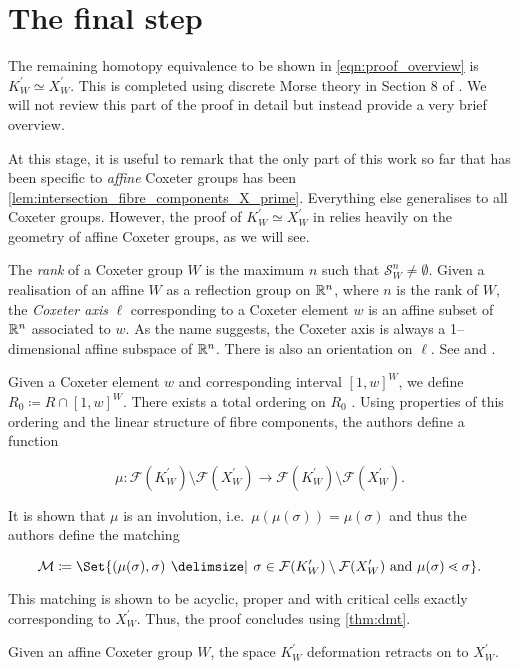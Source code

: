 \documentclass[class=article, crop=false]{standalone}
\begin{document}
\section{The final step}
The remaining homotopy equivalence to be shown in \eqref{eqn:proof_overview} is $K^\prime_W \simeq X^\prime_W$. This is completed using discrete Morse theory in Section 8 of \cite{paolini_salvetti_kpi1_2021}. We will not review this part of the proof in detail but instead provide a very brief overview.

At this stage, it is useful to remark that the only part of this work so far that has been specific to \emph{affine} Coxeter groups has been \cref{lem:intersection_fibre_components_X_prime}. Everything else generalises to all Coxeter groups. However, the proof of $K_W^\prime \simeq X^\prime_W$ in \cite{paolini_salvetti_kpi1_2021} relies heavily on the geometry of affine Coxeter groups, as we will see.

The \emph{rank} of a Coxeter group $W$ is the maximum $n$ such that $\mathcal{S}^n_W \neq \emptyset$. Given a realisation of an affine $W$ as a reflection group on $\mathbb{R}^n$, where $n$ is the rank of $W$, the \emph{Coxeter axis} $\ell$ corresponding to a Coxeter element $w$ is an affine subset of $\mathbb{R}^n$ associated to $w$. As the name suggests, the Coxeter axis is always a 1--dimensional affine subspace of $\mathbb{R}^n$. There is also an orientation on $\ell$. See \cite[Section 4]{paolini_salvetti_kpi1_2021} and \cite[Section 7]{mccammond_dual_2015}.

Given a Coxeter element $w$ and corresponding interval $[1,w]^W$, we define $R_0 \coloneq R \cap [1,w]^W$. There exists a total ordering on $R_0$ \cite[Definition 4.10]{paolini_salvetti_kpi1_2021}. Using properties of this ordering and the linear structure of fibre components, the authors define a function 

\begin{equation*}
    \mu \colon \mathcal{F}(K_W^\prime)\setminus\mathcal{F}(X_W^\prime) \to \mathcal{F}(K_W^\prime)\setminus\mathcal{F}(X_W^\prime) .
\end{equation*}

It is shown that $\mu$ is an involution, i.e.~$\mu(\mu(\sigma)) = \mu(\sigma)$ and thus the authors define the matching

\begin{equation*}
    \mathcal{M} \coloneq \Set{(\mu(\sigma), \sigma) \given \sigma \in \mathcal{F}(K_W^\prime)\setminus\mathcal{F}(X_W^\prime) \text{ and } \mu(\sigma) \lessdot \sigma}.
\end{equation*}

This matching is shown to be acyclic, proper and with critical cells exactly corresponding to $X_W^\prime$. Thus, the proof concludes using \cref{thm:dmt}.

\begin{theorem}
    Given an affine Coxeter group $W$, the space $K^\prime_W$ deformation retracts on to $X^\prime_W$.
\end{theorem}
\end{document}
